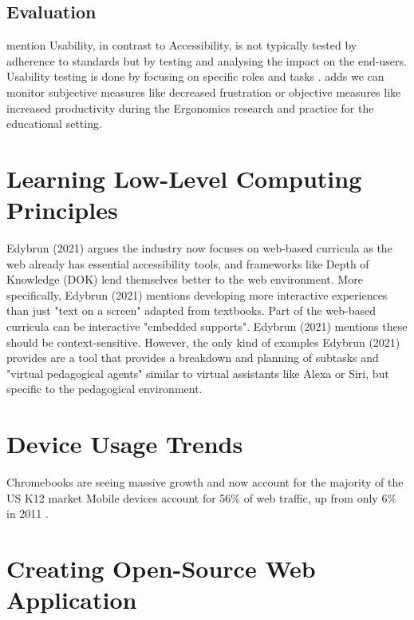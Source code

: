 \subsection{Evaluation}

\textcite{Wegge_Zimmermann_2007} mention Usability, in contrast to Accessibility, is not typically tested by adherence to standards but by testing and analysing the impact on the end-users.
Usability testing is done by focusing on specific roles and tasks \parencite{Wegge_Zimmermann_2007}.
\textcite{Edyburn_2021} adds we can monitor subjective measures like decreased frustration or objective measures like increased productivity during the Ergonomics research and practice for the educational setting.




\section{Learning Low-Level Computing Principles}

Edybrun (2021) argues the industry now focuses on web-based curricula as the web already has essential accessibility tools, and frameworks like Depth of Knowledge (DOK) lend themselves better to the web environment. More specifically, Edybrun (2021) mentions developing more interactive experiences than just "text on a screen" adapted from textbooks. Part of the web-based curricula can be interactive "embedded supports". Edybrun (2021) mentions these should be context-sensitive. However, the only kind of examples Edybrun (2021) provides are a tool that provides a breakdown and planning of subtasks and "virtual pedagogical agents" similar to virtual assistants like Alexa or Siri, but specific to the pedagogical environment.

\section{Device Usage Trends}


Chromebooks are seeing massive growth and now account for the majority of the US K12 market \parencite{Boreham_2019, IDC_2021}
Mobile devices account for 56\% of web traffic, up from only 6\% in 2011 \parencite{StatCounter_2021}.


\section{Creating Open-Source Web Application}


